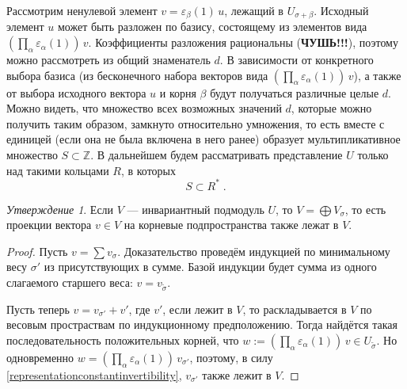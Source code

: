 \documentclass[10pt]{article}
\theoremstyle{remark}
\newtheorem{prop}{Утверждение}
\newcommand{\Z}{\mathbb{Z}}
\begin{document}
Рассмотрим ненулевой элемент $v = \varepsilon_\beta(1) \, u$, лежащий в $U_{\sigma+\beta}$. Исходный элемент $u$ может быть разложен по базису, состоящему из элементов вида $\left(\prod_{\alpha}\varepsilon_\alpha(1)\right) \, v$. Коэффициенты разложения рациональны (\textbf{\color{red}ЧУШЬ!!!}), поэтому можно рассмотреть из общий знаменатель $d$. В зависимости от конкретного выбора базиса (из бесконечного набора векторов вида $\left(\prod_{\alpha}\varepsilon_\alpha(1)\right) \, v$), а также от выбора исходного вектора $u$ и корня $\beta$ будут получаться различные целые $d$. Можно видеть, что множество всех возможных значений $d$, которые можно получить таким образом, замкнуто относительно умножения, то есть вместе с единицей (если она не была включена в него ранее) образует мультипликативное множество $S \subset \Z$. В дальнейшем будем рассматривать представление $U$ только над такими кольцами $R$, в которых
\begin{equation}\label{representationconstantinvertibility} S\subset R^* \; .\end{equation}

\begin{prop}\label{weightprojections}
Если $V$ --- инвариантный подмодуль $U$, то $V = \bigoplus V_\sigma$, то есть проекции вектора $v \in V$ на корневые подпространства также лежат в $V$.
\end{prop}
\begin{proof}
Пусть $v = \sum v_\sigma$. Доказательство проведём индукцией по минимальному весу $\sigma'$ из присутствующих в сумме. Базой индукции будет сумма из одного слагаемого старшего веса: $v = v_{\widetilde\sigma}$.

Пусть теперь $v = v_{\sigma'} + v'$, где $v'$, если лежит в $V$, то раскладывается в $V$ по весовым простраствам по индукционному предположению. Тогда найдётся такая последовательность положительных корней, что $w := \left(\prod_{\alpha}\varepsilon_\alpha(1)\right) \, v \in U_{\widetilde\sigma}$. Но одновременно $w = \left(\prod_{\alpha}\varepsilon_\alpha(1)\right) \, v_{\sigma'}$, поэтому, в силу \ref{representationconstantinvertibility}, $v_{\sigma'}$ также лежит в $V$.
\end{proof}
\end{document}
